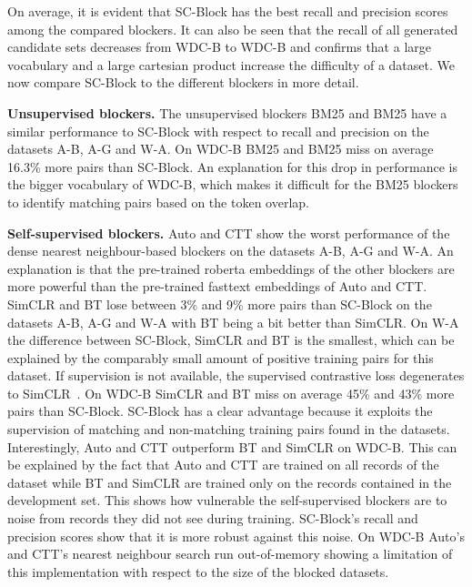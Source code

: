 \documentclass[sigconf,nonacm]{acmart}
\begin{document}
On average, it is evident that SC-Block has the best recall and precision scores among the compared blockers.
It can also be seen that the recall of all generated candidate sets decreases from WDC-B to WDC-B and confirms that a large vocabulary and a large cartesian product increase the difficulty of a dataset. 
We now compare SC-Block to the different blockers in more detail.

\vspace{.1cm}\noindent\textbf{Unsupervised blockers.}
The unsupervised blockers BM25 and BM25 have a similar performance to SC-Block with respect to recall and precision on the datasets A-B, A-G and W-A. On WDC-B BM25 and BM25 miss on average 16.3\% more pairs than SC-Block. An explanation for this drop in performance is the bigger vocabulary of WDC-B, which makes it difficult for the BM25 blockers to identify matching pairs based on the token overlap. 

\vspace{.1cm}\noindent\textbf{Self-supervised blockers.}
Auto and CTT show the worst performance of the dense nearest neighbour-based blockers on the datasets A-B, A-G and W-A. An explanation is that the pre-trained roberta embeddings of the other blockers are more powerful than the pre-trained fasttext embeddings of Auto and CTT.
SimCLR and BT lose between 3\% and 9\% more pairs than SC-Block on the datasets A-B, A-G and W-A with BT being a bit better than SimCLR.
On W-A the difference between SC-Block, SimCLR and BT is the smallest, which can be explained by the comparably small amount of positive training pairs for this dataset. If supervision is not available, the supervised contrastive loss degenerates to SimCLR~\cite{khosla_supervised_2020}.
On WDC-B SimCLR and BT miss on average 45\% and 43\% more pairs than SC-Block.
SC-Block has a clear advantage because it exploits the supervision of matching and non-matching training pairs found in the datasets.
Interestingly, Auto and CTT outperform BT and SimCLR on WDC-B. This can be explained by the fact that Auto and CTT are trained on all records of the dataset while BT and SimCLR are trained only on the records contained in the development set. This shows how vulnerable the self-supervised blockers are to noise from records they did not see during training. SC-Block's recall and precision scores show that it is more robust against this noise. On WDC-B Auto's and CTT's nearest neighbour search run out-of-memory showing a limitation of this implementation with respect to the size of the blocked datasets.
\end{document}
